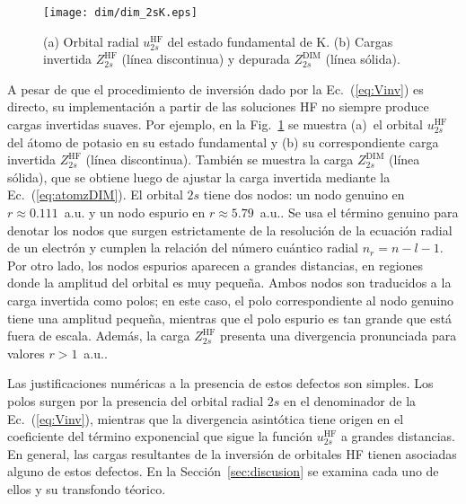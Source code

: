 \begin{figure}[t]
\centering
\texttt{[image: dim/dim\_2sK.eps]} 
\caption[Orbital radial y carga efectiva correspondiente.]
{(a) Orbital radial $u_{2s}^{\mathrm{HF}}$ del estado fundamental de K.
(b) Cargas invertida $Z_{2s}^{\mathrm{HF}}$ (línea discontinua) 
y depurada $Z_{2s}^{\mathrm{DIM}}$ (línea sólida).}
\label{fig:2sK}
\end{figure}

A pesar de que el procedimiento de inversión dado por la 
Ec.~(\ref{eq:Vinv}) es directo, su implementación a partir de las 
soluciones HF no siempre produce cargas invertidas suaves. Por ejemplo,
en la Fig.~\ref{fig:2sK} se muestra (a)~el orbital $u_{2s}^{\mathrm{HF}}$ 
del átomo de potasio en su estado fundamental y (b) su correspondiente 
carga invertida $Z_{2s}^{\mathrm{HF}}$ (línea discontinua). También se 
muestra la carga $Z_{2s}^{\mathrm{DIM}}$ (línea sólida), que se obtiene 
luego de ajustar la carga invertida mediante la Ec.~(\ref{eq:atomzDIM}). 
El orbital $2s$ tiene dos nodos: un nodo genuino en $r\approx 0.111$~a.u. 
y un nodo espurio en \mbox{$r\approx 5.79$~a.u.}. Se usa el término 
genuino para denotar los nodos que surgen estrictamente de la resolución 
de la ecuación radial de un electrón y cumplen la relación del número 
cuántico radial $n_r=n-l-1$. Por otro lado, los nodos espurios aparecen 
a grandes distancias, en regiones donde la amplitud del orbital es muy 
pequeña. Ambos nodos son traducidos a la carga invertida como polos; en 
este caso, el polo correspondiente al nodo genuino tiene una amplitud 
pequeña, mientras que el polo espurio es tan grande que está fuera de 
escala. Además, la carga $Z_{2s}^{\mathrm{HF}}$ presenta una divergencia 
pronunciada para valores $r>1$~a.u.. 

Las justificaciones numéricas a la presencia de estos defectos son 
simples. Los polos surgen por la presencia del orbital radial $2s$ en el 
denominador de la Ec.~(\ref{eq:Vinv}), mientras que la divergencia 
asintótica tiene origen en el coeficiente del término exponencial que 
sigue la función $u_{2s}^{\mathrm{HF}}$ a grandes distancias.
En general, las cargas resultantes de la inversión de orbitales HF 
tienen asociadas alguno de estos defectos. En la 
Sección~\ref{sec:discusion} se examina cada uno de ellos y su 
transfondo téorico.

